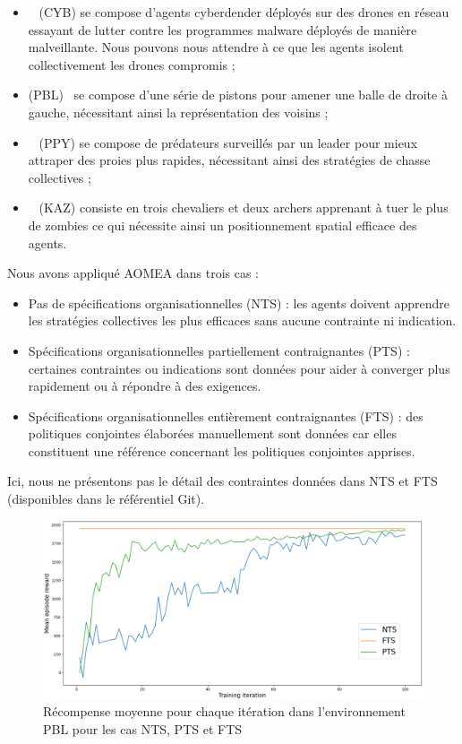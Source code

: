 \documentclass[contribution]{jfsma}
\begin{document}
\begin{itemize}
  \item {}~\cite{cage_challenge_3_announcement} (CYB) se compose d'agents cyberdender déployés sur des drones en réseau essayant de lutter contre les programmes malware déployés de manière malveillante. Nous pouvons nous attendre à ce que les agents \allowbreak isolent collectivement les drones compromis ;
  \item {} (PBL)~\cite{Terry2021} se compose d'une série de pistons pour amener une balle de droite à gauche, nécessitant ainsi la représentation des voisins ;
  \item {}~\cite{Lowe2017} (PPY) se compose de prédateurs surveillés par un leader pour mieux attraper des proies plus rapides, nécessitant ainsi des stratégies de chasse collectives ;
  \item {}~\cite{Terry2021} (KAZ) consiste en trois chevaliers et deux archers apprenant à tuer le plus de zombies ce qui nécessite ainsi un positionnement spatial efficace des agents.
\end{itemize}

Nous avons appliqué AOMEA dans trois cas :
\begin{itemize}
  \item Pas de spécifications organisationnelles (NTS) : les agents doivent apprendre les stratégies collectives les plus efficaces sans aucune contrainte ni indication.
  \item Spécifications organisationnelles partiellement contraignantes (PTS) : certaines contraintes ou indications sont données pour aider à converger plus rapidement ou à répondre à des exigences.
  \item Spécifications organisationnelles entièrement contraignantes (FTS) : des politiques conjointes élaborées manuellement sont données car elles constituent une référence concernant les politiques conjointes apprises.
\end{itemize}

Ici, nous ne présentons pas le détail des contraintes données dans NTS et FTS (disponibles dans le référentiel Git\footnotemark[1]).

\begin{figure}[h!]
  \centering
  \includegraphics[width=\linewidth]{figures/prahom_learning_curve.png}
  \caption{Récompense moyenne pour chaque itération dans l'environnement PBL pour les cas NTS, PTS et FTS}
  \label{fig:prahom_learning_curve}
\end{figure}
\end{document}
